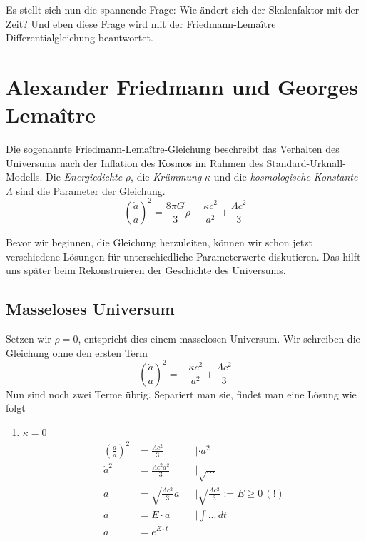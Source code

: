 \begin{refsection}
Es stellt sich nun die spannende Frage: Wie ändert sich der Skalenfaktor mit der Zeit? Und eben diese Frage wird mit der Friedmann-Lema\^{i}tre Differentialgleichung beantwortet.

\section{Alexander Friedmann und Georges Lema\^{i}tre}
Die sogenannte Friedmann-Lema\^{i}tre-Gleichung beschreibt das Verhalten des Universums nach der Inflation des Kosmos im Rahmen des Standard-Urknall-Modells. Die {\em Energiedichte} $\rho$, die {\em Krümmung} $\kappa$ und die {\em kosmologische Konstante} $\Lambda$ sind die Parameter der Gleichung.
\begin{equation}
\left(\frac{\dot{a}}{a}\right) ^2 = \frac{8 \pi G}{3} \rho - \frac{\kappa c^2}{a^2} + \frac{\Lambda c^2}{3}
\end{equation}

Bevor wir beginnen, die Gleichung herzuleiten, können wir schon jetzt verschiedene Lösungen für unterschiedliche Parameterwerte diskutieren. Das hilft uns später beim Rekonstruieren der Geschichte des Universums.

\subsection{Masseloses Universum}
Setzen wir $\rho = 0$, entspricht dies einem masselosen Universum.  Wir schreiben die Gleichung ohne den ersten Term
\[\left(\frac{\dot{a}}{a}\right) ^2 = - \frac{\kappa c^2}{a^2} + \frac{\Lambda c^2}{3}\]
Nun sind noch zwei Terme übrig. Separiert man sie, findet man eine Lösung wie folgt
\begin{enumerate}
	\item $\kappa = 0$ 
		\begin{align}
			\nonumber \left(\frac{\dot{a}}{a}\right) ^2 &= \frac{\Lambda c^2}{3}  &&| \cdot a^2 \\
			\nonumber \dot{a} ^2 &= \frac{\Lambda c^2 a^2}{3}  &&|\sqrt{...}\\
			\nonumber \dot{a} &= \sqrt{\frac{\Lambda c^2}{3}} a &&|\sqrt{\frac{\Lambda c^2}{3}} := E \ge 0 \, (!)\\
			\nonumber \dot{a} &= E \cdot a &&|\int ...\, dt \\
			a &= e^{E \cdot t} \label{friedmann:Lambda}
		\end{align}
	

\end{enumerate}
\end{refsection}
